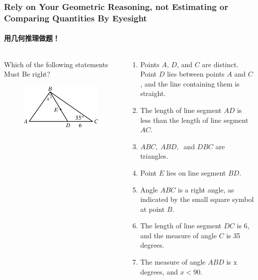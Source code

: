 \documentclass[
	11pt, %
]{beamer}
\begin{document}
\begin{frame}
	\frametitle{Rely on Your Geometric Reasoning, not Estimating or Comparing Quantities By Eyesight} %
	\framesubtitle{用几何推理做题！}
	\begin{columns}[t] 
		\begin{column}{0.4\textwidth} %
		Which of the following statements \alert{Must Be} right?
			\begin{figure}
				\includegraphics[width=\linewidth]{Not_Scale.jpg}
			\end{figure}
		\end{column}

	\begin{column}{0.6\textwidth} %
	\begin{enumerate}
		\item Points $A$, $D$, and $C$ are distinct. Point $D$ lies between points $A$ and $C$, and the line containing them is straight.
		\item The length of line segment $AD$ is less than the length of line segment $AC$.
		\item $ABC,\ ABD,\ $ and $DBC$ are triangles.
		\item Point $E$ lies on line segment $BD$.
		\item Angle $ABC$ is a right angle, as indicated by the small square symbol at point $B$.
		\item The length of line segment $DC$ is 6, and the measure of angle $C$ is 35 degrees.
		\item The measure of angle $ABD$ is x degrees, and $x<90$.
	\end{enumerate}
	\end{column}
	\end{columns}
\end{frame}
\end{document}
